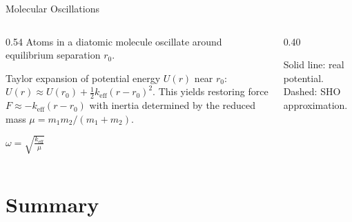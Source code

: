 \documentclass[aspectratio=169,xcolor=dvipsnames]{beamer}
\begin{document}
\begin{frame}{Molecular Oscillations}
  \begin{columns}[T]
    \begin{column}{0.54\textwidth}
      Atoms in a diatomic molecule oscillate around equilibrium separation $r_0$.
      \begin{umnote}
        Taylor expansion of potential energy $U(r)$ near $r_0$:
        $U(r) \approx U(r_0) + \frac{1}{2}k_{\text{eff}}(r-r_0)^2$.
        This yields restoring force $F \approx -k_{\text{eff}}(r-r_0)$ with inertia determined by the reduced mass $\mu = m_1 m_2 / (m_1 + m_2)$.
      \end{umnote}
      \begin{umformula}
        \centering
        $\omega = \sqrt{\frac{k_{\text{eff}}}{\mu}}$
      \end{umformula}
    \end{column}
    \hfill
    \begin{column}{0.40\textwidth}
      \centering
      \tiny Solid line: real potential. Dashed: SHO approximation.
    \end{column}
  \end{columns}
\end{frame}

\section{Summary}
\end{document}
